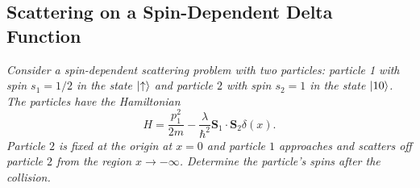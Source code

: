 \documentclass[11pt, a4paper]{article}
\renewcommand{\vec}[1]{\bm{#1}} %
\newcommand{\ua}{\uparrow}  %
\begin{document}
	
\subsection{Scattering on a Spin-Dependent Delta Function}
\textit{Consider a spin-dependent scattering problem with two particles: particle 1 with spin $ s_{1} = 1/2 $ in the state $ \ket{\ua} $ and particle $ 2 $ with spin $ s_{2} = 1 $ in the state $ \ket{10} $. The particles have the Hamiltonian}
\begin{equation*}
	H = \frac{p_{1}^{2}}{2m} - \frac{\lambda}{\hbar^{2}}\vec{S}_{1}\cdot \vec{S}_{2}\delta(x).
\end{equation*}
\textit{Particle $ 2 $ is fixed at the origin at $ x = 0 $ and particle $ 1 $ approaches and scatters off particle $ 2 $ from the region $ x \to -\infty $. Determine the particle's spins after the collision.}
\end{document}

